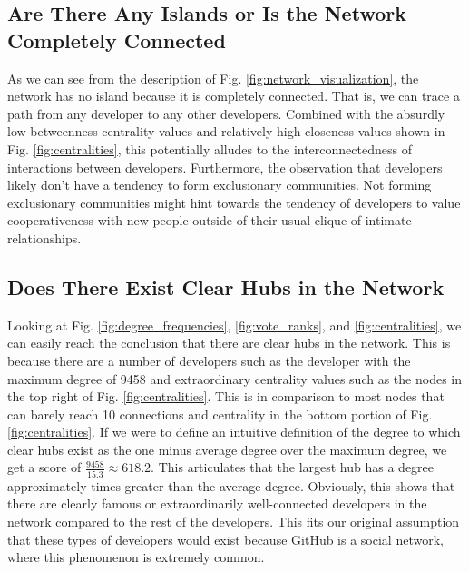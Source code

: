 \documentclass[9pt,twocolumn,twoside]{pnas-new}
\begin{document}
\subsection{Are There Any Islands or Is the Network Completely Connected}

As we can see from the description of Fig. \ref{fig:network_visualization}, the network has no island because it is completely connected. That is, we can trace a path from any developer to any other developers. Combined with the absurdly low betweenness centrality values and relatively high closeness values shown in Fig. \ref{fig:centralities}, this potentially alludes to the interconnectedness of interactions between developers. Furthermore, the observation that developers likely don't have a tendency to form exclusionary communities. Not forming exclusionary communities might hint towards the tendency of developers to value cooperativeness with new people outside of their usual clique of intimate relationships.

\subsection{Does There Exist Clear Hubs in the Network}

Looking at Fig. \ref{fig:degree_frequencies}, \ref{fig:vote_ranks}, and \ref{fig:centralities}, we can easily reach the conclusion that there are clear hubs in the network. This is because there are a number of developers such as the developer with the maximum degree of 9458 and extraordinary centrality values such as the nodes in the top right of Fig. \ref{fig:centralities}. This is in comparison to most nodes that can barely reach 10 connections and centrality in the bottom portion of Fig. \ref{fig:centralities}. If we were to define an intuitive definition of the degree to which clear hubs exist as the one minus average degree over the maximum degree, we get a score of $\frac{9458}{15.3} \approx 618.2$. This articulates that the largest hub has a degree approximately times greater than the average degree. Obviously, this shows that there are clearly famous or extraordinarily well-connected developers in the network compared to the rest of the developers. This fits our original assumption that these types of developers would exist because GitHub is a social network, where this phenomenon is extremely common.
\end{document}
